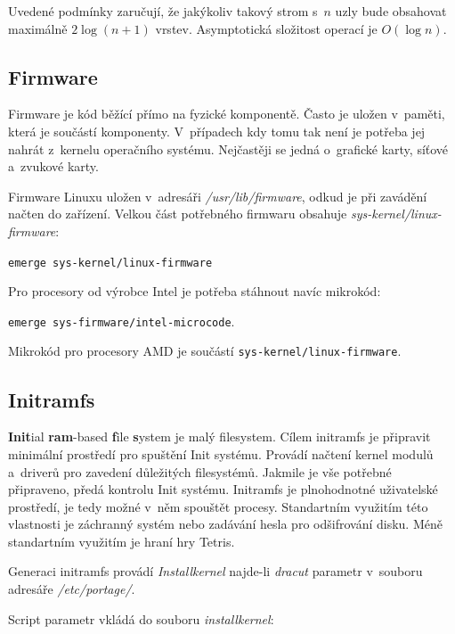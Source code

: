 \documentclass[12pt,a4paper,twoside,]{article}
\begin{document}
{{{{{{{\hspace*{-1.5em}Uvedené podmínky zaručují, že jakýkoliv takový strom s~$n$ uzly bude obsahovat \\maximálně $2\log(n+1)$ vrstev. Asymptotická složitost operací je $O(\log n)$.\\



\subsection{\textsf{Firmware}}
Firmware je kód běžící přímo na fyzické komponentě. Často je uložen v~paměti, která je součástí komponenty. V~případech kdy tomu tak není je potřeba jej nahrát z~kernelu operačního systému. Nejčastěji se jedná o~grafické karty, síťové a~zvukové karty. 

Firmware Linuxu uložen v~adresáři \textit{/usr/lib/firmware}, odkud je při zavádění načten do zařízení. Velkou část potřebného firmwaru obsahuje \textit{sys-kernel/linux-firmware}:

\texttt{emerge sys-kernel/linux-firmware}

\hspace{-1.5em}Pro procesory od výrobce Intel je potřeba stáhnout navíc mikrokód:

\texttt{emerge sys-firmware/intel-microcode}. 

\hspace{-1.5em}Mikrokód pro procesory AMD je součástí  \texttt{sys-kernel/linux-firmware}.
\subsection{\textsf{Initramfs}} \hypertarget{Initramfs}{}
{\bf Init}ial {\bf ram}-based {\bf f}ile {\bf s}ystem je malý filesystem. Cílem initramfs je připravit minimální prostředí pro spuštění Init systému. Provádí načtení kernel modulů a~driverů pro zavedení důležitých filesystémů. Jakmile je vše potřebné připraveno, předá kontrolu Init systému.
Initramfs je plnohodnotné uživatelské prostředí, je tedy možné v~něm spouštět procesy. Standartním využitím této vlastnosti je záchranný systém nebo zadávání hesla pro odšifrování disku. Méně standartním využitím je hraní hry Tetris. 

Generaci initramfs provádí \textit{Installkernel} najde-li \textit{dracut} parametr v~souboru adresáře \textit{/etc/portage/}.

\hspace{-1.5em}Script parametr vkládá do souboru \textit{installkernel}:

}}}}}}}
\end{document}
